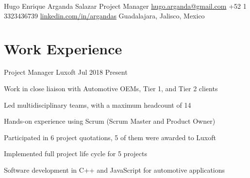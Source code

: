 \documentclass[10pt, letterpaper]{article} %
\begin{document}

\customheader
{Hugo Enrique Arganda Salazar}
{Project Manager}
{\href{mailto:hugo.arganda@gmail.com}{hugo.arganda@gmail.com}}
{+52 1 3323436739}
{\href{https://www.linkedin.com/in/argandas}{linkedin.com/in/argandas}}
{Guadalajara, Jalisco, Mexico}







\section{Work Experience}

\job
{Project Manager}
{Luxoft}
{Jul 2018}
{Present}
{
\begin{itemize-bullets}
\item{Work in close liaison with Automotive OEMs, Tier 1, and Tier 2 clients}
\item{Led multidisciplinary teams, with a maximum headcount of 14}
\item{Hands-on experience using Scrum (Scrum Master and Product Owner)}
\item{Participated in 6 project quotations, 5 of them were awarded to Luxoft}
\item{Implemented full project life cycle for 5 projects}
\item{Software development in C++ and JavaScript for automotive applications}
\end{itemize-bullets}
}
\end{document}
